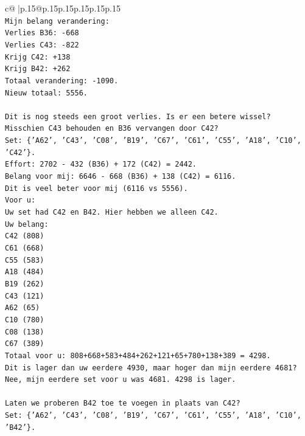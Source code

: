 \documentclass{article}
\begin{document}
{\begin{supertabular}{c@{$\;$}|p{.15\linewidth}@{}p{.15\linewidth}p{.15\linewidth}p{.15\linewidth}p{.15\linewidth}p{.15\linewidth}}
{{{\\ 
\texttt{Mijn belang verandering:} \\
\texttt{Verlies B36: {-}668} \\
\texttt{Verlies C43: {-}822} \\
\texttt{Krijg C42: +138} \\
\texttt{Krijg B42: +262} \\
\texttt{Totaal verandering: {-}1090.} \\
\texttt{Nieuw totaal: 5556.} \\
\\ 
\texttt{Dit is nog steeds een groot verlies. Is er een betere wissel?} \\
\texttt{Misschien C43 behouden en B36 vervangen door C42?} \\
\texttt{Set: \{'A62', 'C43', 'C08', 'B19', 'C67', 'C61', 'C55', 'A18', 'C10', 'C42'\}.} \\
\texttt{Effort: 2702 {-} 432 (B36) + 172 (C42) = 2442.} \\
\texttt{Belang voor mij: 6646 {-} 668 (B36) + 138 (C42) = 6116.} \\
\texttt{Dit is veel beter voor mij (6116 vs 5556).} \\
\texttt{Voor u:} \\
\texttt{Uw set had C42 en B42. Hier hebben we alleen C42.} \\
\texttt{Uw belang:} \\
\texttt{C42 (808)} \\
\texttt{C61 (668)} \\
\texttt{C55 (583)} \\
\texttt{A18 (484)} \\
\texttt{B19 (262)} \\
\texttt{C43 (121)} \\
\texttt{A62 (65)} \\
\texttt{C10 (780)} \\
\texttt{C08 (138)} \\
\texttt{C67 (389)} \\
\texttt{Totaal voor u: 808+668+583+484+262+121+65+780+138+389 = 4298.} \\
\texttt{Dit is lager dan uw eerdere 4930, maar hoger dan mijn eerdere 4681? Nee, mijn eerdere set voor u was 4681. 4298 is lager.} \\
\\ 
\texttt{Laten we proberen B42 toe te voegen in plaats van C42?} \\
\texttt{Set: \{'A62', 'C43', 'C08', 'B19', 'C67', 'C61', 'C55', 'A18', 'C10', 'B42'\}.} \\
}}}
\end{supertabular}}
\end{document}

